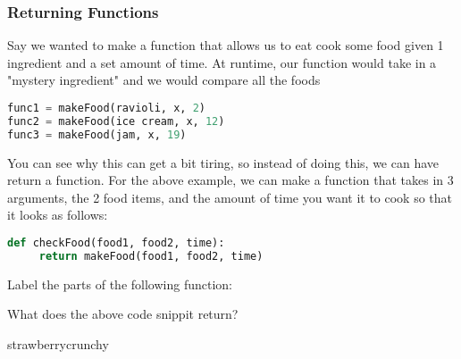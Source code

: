 \documentclass{article}
\begin{document}
\subsubsection{Returning Functions}
Say we wanted to make a function that allows us to eat cook some food given 1 ingredient and a set amount of time. At runtime, our function would take in a "mystery ingredient" and we would compare all the foods 
\begin{lstlisting}[language = Python]
func1 = makeFood(ravioli, x, 2)
func2 = makeFood(ice cream, x, 12)
func3 = makeFood(jam, x, 19)
\end{lstlisting}
You can see why this can get a bit tiring, so instead of doing this, we can have return a function. For the above example, we can make a function that takes in 3 arguments, the 2 food items, and the amount of time you want it to cook so that it looks as follows: 
\begin{lstlisting}[language = Python]
def checkFood(food1, food2, time):
     return makeFood(food1, food2, time)
\end{lstlisting}
\begin{subq}
 \subqs Label the parts of the following function: 
 
  \bigskip
 
\begin{solution}


 \end{solution}
 \subqs What does the above code snippit return? 
 \begin{solution}
 strawberrycrunchy
 \end{solution}
\end{subq}
\newpage
\end{document}
